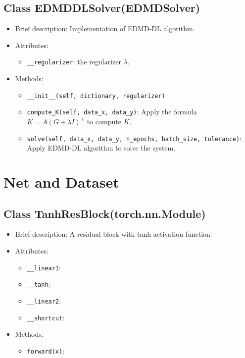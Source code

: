 \subsection{Class EDMDDLSolver(EDMDSolver)}

\begin{itemize}
\item Brief description: Implementation of EDMD-DL algorithm.
\item Attributes:
  \begin{itemize}
  \item \lstinline|__regularizer|: the regularizer $\lambda$.
  \end{itemize}
\item Methods:
  \begin{itemize}
  \item \lstinline|__init__(self, dictionary, regularizer)|
  \item \lstinline|compute_K(self, data_x, data_y)|:
    Apply the formula $K = A(G + \lambda I)^+$ to compute $K$.
  \item \lstinline|solve(self, data_x, data_y, n_epochs, batch_size, tolerance)|:
    Apply EDMD-DL algorithm to solve the system.
  \end{itemize}
\end{itemize}

\section{Net and Dataset}

\subsection{Class TanhResBlock(torch.nn.Module)}

\begin{itemize}
\item Brief description: A residual block with tanh activation function.
\item Attributes:
  \begin{itemize}
  \item \lstinline|__linear1|: 
  \item \lstinline|__tanh|: 
  \item \lstinline|__linear2|:
  \item \lstinline|__shortcut|:
  \end{itemize}
\item Methods:
  \begin{itemize}
  \item \lstinline|forward(x)|:
  \end{itemize}
\end{itemize}

